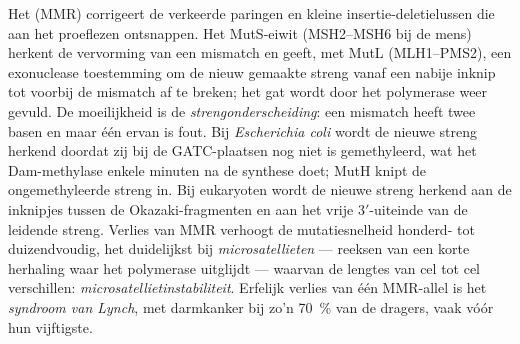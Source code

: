 \begin{definition}[Mismatchherstel]\label{def:b3:dna-repair:mmr}
Het \emph{} (MMR) corrigeert de verkeerde paringen en
kleine insertie-deletielussen die aan het proeflezen ontsnappen. Het
MutS-eiwit (MSH2--MSH6 bij de mens) herkent de vervorming van een
mismatch en geeft, met MutL (MLH1--PMS2), een exonuclease toestemming
om de nieuw gemaakte streng vanaf een nabije inknip tot voorbij de
mismatch af te breken; het gat wordt door het polymerase weer gevuld.
De moeilijkheid is de \emph{strengonderscheiding}: een mismatch heeft
twee basen en maar één ervan is fout. Bij \emph{Escherichia coli}
wordt de nieuwe streng herkend doordat zij bij de GATC-plaatsen nog
niet is gemethyleerd, wat het Dam-methylase enkele minuten na de
synthese doet; MutH knipt de ongemethyleerde streng in. Bij eukaryoten
wordt de nieuwe streng herkend aan de inknipjes tussen de
Okazaki-fragmenten en aan het vrije 3$'$-uiteinde van de leidende
streng. Verlies van MMR verhoogt de mutatiesnelheid honderd- tot
duizendvoudig, het duidelijkst bij \emph{microsatellieten} --- reeksen
van een korte herhaling waar het polymerase uitglijdt --- waarvan de
lengtes van cel tot cel verschillen: \emph{microsatellietinstabiliteit}.
Erfelijk verlies van één MMR-allel is het \emph{syndroom van Lynch},
met darmkanker bij zo'n \qty{70}{\%} van de dragers, vaak vóór hun
vijftigste.
\end{definition}

